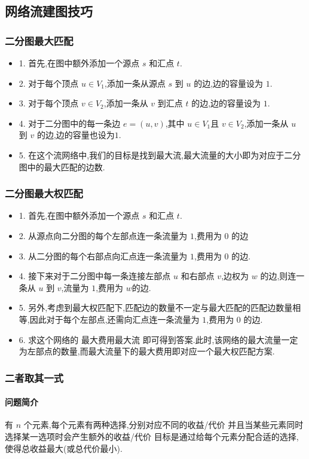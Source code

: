 \subsection{网络流建图技巧}
\subsubsection{二分图最大匹配}
\begin{itemize}
    \item 1. 首先,在图中额外添加一个源点 $s$ 和汇点 $t$.
    \item 2. 对于每个顶点 $u\in V_1$,添加一条从源点 $s$ 到 $u$ 的边,边的容量设为 $1$.
    \item 3. 对于每个顶点 $v\in V_2$,添加一条从 $v$ 到汇点 $t$ 的边,边的容量设为 $1$.
    \item 4. 对于二分图中的每一条边 $e=(u,v)$,其中 $u\in V_1$且 $v\in V_2$,添加一条从 $u$ 到 $v$ 的边,边的容量也设为$1$.
    \item 5. 在这个流网络中,我们的目标是找到最大流,最大流量的大小即为对应于二分图中的最大匹配的边数.
\end{itemize}

\subsubsection{二分图最大权匹配}
\begin{itemize}
    \item 1. 首先,在图中额外添加一个源点 $s$ 和汇点 $t$.
    \item 2. 从源点向二分图的每个左部点连一条流量为 $1$,费用为 $0$ 的边
    \item 3. 从二分图的每个右部点向汇点连一条流量为 $1$,费用为 $0$ 的边.
    \item 4. 接下来对于二分图中每一条连接左部点 $u$ 和右部点 $v$,边权为 $w$ 的边,则连一条从 $u$ 到 $v$,流量为 $1$,费用为 $w$的边.
    \item 5. 另外,考虑到最大权匹配下,匹配边的数量不一定与最大匹配的匹配边数量相等,因此对于每个左部点,还需向汇点连一条流量为 $1$,费用为 $0$ 的边.
    \item 6. 求这个网络的 最大费用最大流 即可得到答案.此时,该网络的最大流量一定为左部点的数量,而最大流量下的最大费用即对应一个最大权匹配方案.
\end{itemize}

\subsubsection{二者取其一式}
\paragraph{问题简介}
有 $n$ 个元素,每个元素有两种选择,分别对应不同的收益/代价
并且当某些元素同时选择某一选项时会产生额外的收益/代价
目标是通过给每个元素分配合适的选择,使得总收益最大(或总代价最小).

